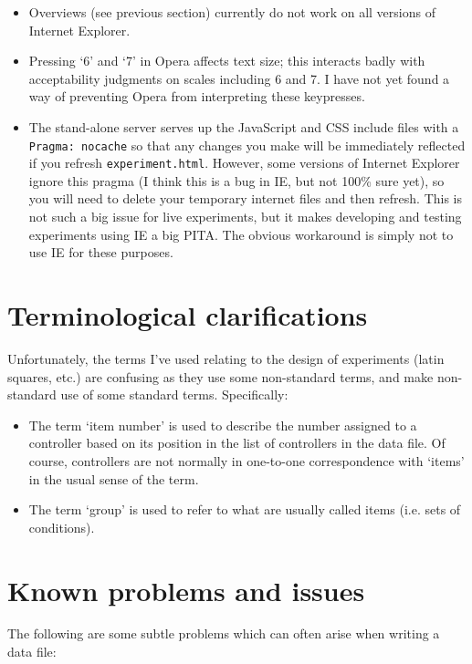 \documentclass[11pt,letterpaper]{article}
\begin{document}
\begin{itemize}

\item
 Overviews (see previous section) currently do not work on all versions of Internet Explorer.
\item
 Pressing `6' and `7' in Opera affects text size; this interacts badly with acceptability judgments on scales including 6 and 7. I have not yet found a way of preventing Opera from interpreting these keypresses.
\item
 The stand-alone server serves up the JavaScript and CSS include files with a \texttt{Pragma: nocache} so that any changes you make will be immediately reflected if you refresh \texttt{experiment.html}. However, some versions of Internet Explorer ignore this pragma (I think this is a bug in IE, but not 100\% sure yet), so you will need to delete your temporary internet files and then refresh. This is not such a big issue for live experiments, but it makes developing and testing experiments using IE a big PITA. The obvious workaround is simply not to use IE for these purposes.
\end{itemize}
\section{Terminological clarifications}

Unfortunately, the terms I've used relating to the design of experiments (latin squares, etc.) are confusing as they use some non-standard terms, and make non-standard use of some standard terms. Specifically:

\begin{itemize}

\item
 The term `item number' is used to describe the number assigned to a controller based on its position in the list of controllers in the data file. Of course, controllers are not normally in one-to-one correspondence with `items' in the usual sense of the term.
\item
 The term `group' is used to refer to what are usually called items (i.e. sets of conditions).
\end{itemize}
\section{Known problems and issues}

The following are some subtle problems which can often arise when writing a
data file:
\end{document}
